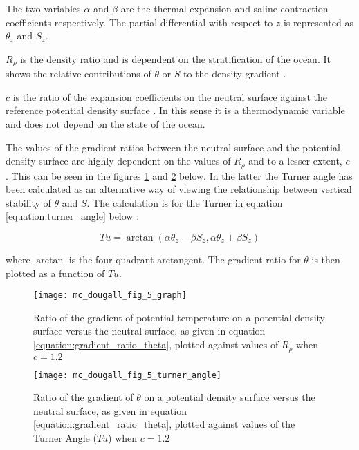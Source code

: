 The two variables $\alpha$ and $\beta$ are the thermal expansion and saline contraction coefficients respectively. The partial differential with respect to $z$ is represented as $\theta_z$ and $S_z$.

$R_\rho$ is the density ratio and is dependent on the stratification of the ocean. It shows the relative contributions of $\theta$ or $S$ to the density gradient \citep{YOU2002}.    

$c$ is the ratio of the expansion coefficients on the neutral surface against the reference potential density surface \citep{McDougall1987}. In this sense it is a thermodynamic variable and does not depend on the state of the ocean.

The values of the gradient ratios between the neutral surface and the potential density surface are highly dependent on the values of $R_\rho$ and to a lesser extent, $c$ \citet{McDougall1987}. This can be seen in the figures \ref{fig:gradient_theory_mcdougall_fig5_graph} and \ref{fig:gradient_theory_mcdougall_fig5_turner_angle} below. In the latter the Turner angle has been calculated as an alternative way of viewing the relationship between vertical stability of $\theta$ and $S$. The calculation is for the Turner in equation \ref{equation:turner_angle} below \citet{McDougall1987}:

\begin{equation}
    Tu = \arctan(\alpha\theta_z - \beta S_z, \alpha\theta_z + \beta S_z)
    \label{equation:turner_angle}
\end{equation}

where $\arctan$ is the four-quadrant arctangent. The gradient ratio for $\theta$ is then plotted as a function of $Tu$. 

\begin{figure}[htbp]
    \centering
    \texttt{[image: mc\_dougall\_fig\_5\_graph]}
    \caption{Ratio of the gradient of potential temperature on a potential density surface versus the neutral surface, as given in equation \ref{equation:gradient_ratio_theta}, plotted against values of $R_\rho$ when $c = 1.2$ \citep{McDougall1987}}
    \label{fig:gradient_theory_mcdougall_fig5_graph}
\end{figure}

\begin{figure}[htbp]
    \centering
    \texttt{[image: mc\_dougall\_fig\_5\_turner\_angle]}
    \caption{Ratio of the gradient of $\theta$ on a potential density surface versus the neutral surface, as given in equation \ref{equation:gradient_ratio_theta}, plotted against values of the Turner Angle ($Tu$) when $c = 1.2$ \citep{McDougall1987}}
    \label{fig:gradient_theory_mcdougall_fig5_turner_angle}
\end{figure}

